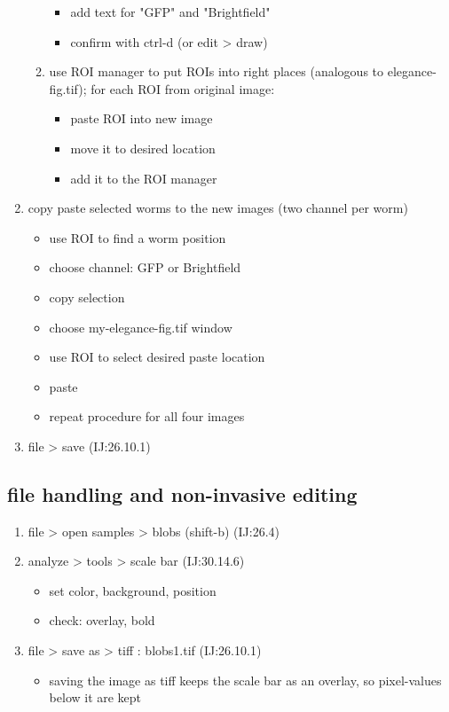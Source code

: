 \documentclass[11pt]{article}
\begin{document}
\begin{enumerate}
\begin{enumerate}
\begin{itemize}
\item add text for "GFP" and "Brightfield"
\item confirm with ctrl-d (or edit > draw)
\end{itemize}
\item use ROI manager to put ROIs into right places (analogous to
elegance-fig.tif); for each ROI from original image:
\begin{itemize}
\item paste ROI into new image
\item move it to desired location
\item add it to the ROI manager
\end{itemize}
\end{enumerate}
\item copy paste selected worms to the new images (two channel per worm)
\begin{itemize}
\item use ROI to find a worm position
\item choose channel: GFP or Brightfield
\item copy selection
\item choose my-elegance-fig.tif window
\item use ROI to select desired paste location
\item paste
\item repeat procedure for all four images
\end{itemize}
\item file > save (IJ:26.10.1)
\end{enumerate}

\subsection{file handling and non-invasive editing}
\label{sec-1-4}
\begin{enumerate}
\item file > open samples > blobs (shift-b) (IJ:26.4)
\item analyze > tools > scale bar (IJ:30.14.6)
\begin{itemize}
\item set color, background, position
\item check: overlay, bold
\end{itemize}
\item file > save as > tiff : blobs1.tif (IJ:26.10.1)
\begin{itemize}
\item saving the image as tiff keeps the scale bar as an overlay, so pixel-values below it are kept
\end{itemize}
\end{enumerate}
\end{document}
